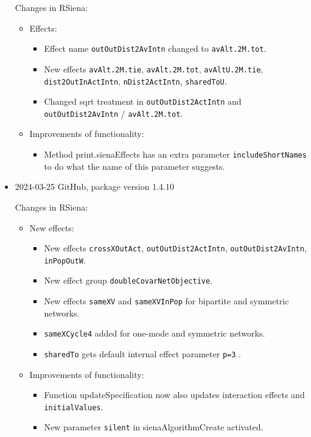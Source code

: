 \documentclass[a4paper,fleqn,11pt]{article}
\newcommand{\+}{\, + \,}
\newcommand{\sfn}[1]{\textsf{#1}}
\begin{document}
\begin{small}
\begin{itemize}
Changes in RSiena:
\begin{itemize}
\item Effects:
   \begin{itemize}
  \item Effect name \texttt{outOutDist2AvIntn} changed to \texttt{avAlt.2M.tot}.
  \item New effects \texttt{avAlt.2M.tie}, \texttt{avAlt.2M.tot}, \texttt{avAltU.2M.tie},
    \texttt{dist2OutInActIntn}, \texttt{nDist2ActIntn}, \texttt{sharedToU}.
  \item Changed sqrt treatment in \texttt{outOutDist2ActIntn} and
    \texttt{outOutDist2AvIntn} / \texttt{avAlt.2M.tot}.
  \end{itemize}
\item Improvements of functionality:
   \begin{itemize}
  \item Method \sfn{print.sienaEffects} has an extra parameter \texttt{includeShortNames}
    to do what the name of this parameter suggests.
    \end{itemize}
\end{itemize}


\item 2024-03-25 GitHub, package version 1.4.10


Changes in RSiena:
\begin{itemize}
\item New effects:
   \begin{itemize}
  \item New effects \texttt{crossXOutAct}, \texttt{outOutDist2ActIntn},
    \texttt{outOutDist2AvIntn}, \texttt{inPopOutW}.
  \item New effect group \texttt{doubleCovarNetObjective}.
  \item New effects \texttt{sameXV} and \texttt{sameXVInPop} for bipartite
    and symmetric networks.
  \item \texttt{sameXCycle4} added for one-mode and symmetric networks.
  \item \texttt{sharedTo} gets default internal effect parameter \texttt{p=3} .
  \end{itemize}
\item Improvements of functionality:
   \begin{itemize}
  \item Function \sfn{updateSpecification} now also updates interaction effects
    and \texttt{initialValues}.
  \item New parameter \texttt{silent} in \sfn{sienaAlgorithmCreate} activated.
  \end{itemize}
\end{itemize}



\end{itemize}
\end{small}
\end{document}
